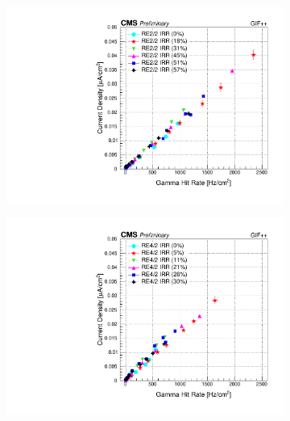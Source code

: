 	\begin{figure}[H]
    	\begin{subfigure}{0.5\linewidth}
			\centering
    		\includegraphics[width = \linewidth]{fig/chapt5/RE2-2_IRR_Current_vs_Rate.pdf}
        	\caption{\label{fig:GIFpp_j_vs_rate:A}}
    	\end{subfigure}
    	\begin{subfigure}{0.5\linewidth}
			\centering
    		\includegraphics[width = \linewidth]{fig/chapt5/RE4-2_IRR_Current_vs_Rate.pdf}
        	\caption{\label{fig:GIFpp_j_vs_rate:B}}
    	\end{subfigure}
    	\begin{subfigure}{0.5\linewidth}
			\centering

\end{subfigure}
\end{figure}
